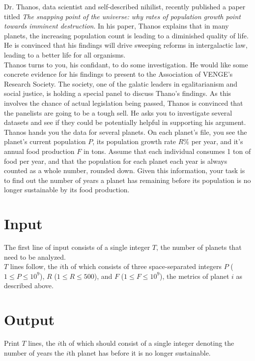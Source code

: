 
\noindent Dr. Thanos, data scientist and self-described nihilist, recently published a paper titled \textit{The snapping point of the universe: why rates of population growth point towards imminent destruction}. In his paper, Thanos explains that in many planets, the increasing population count is leading to a diminished quality of life. He is convinced that his findings will drive sweeping reforms in intergalactic law, leading to a better life for all organisms.\\

Thanos turns to you, his confidant, to do some investigation. He would like some concrete evidence for his findings to present to the Association of VENGE's Research Society. The society, one of the galatic leaders in egalitarianism and social justice, is holding a special panel to discuss Thano's findings. As this involves the chance of actual legislation being passed, Thanos is convinced that the panelists are going to be a tough sell. He asks you to investigate several datasets and see if they could be potentially helpful in supporting his argument.\\

Thanos hands you the data for several planets. On each planet's file, you see the planet's current population $P$, its population growth rate $R\%$ per year, and it's annual food production $F$ in tons. Assume that each individual consumes 1 ton of food per year, and that the population for each planet each year is always counted as a whole number, rounded down. Given this information, your task is to find out the number of years a planet has remaining before its population is no longer sustainable by its food production.

\section*{Input}
The first line of input consists of a single integer $T$, the number of planets that need to be analyzed.\\

\noindent $T$ lines follow, the $i$th of which consists of three space-separated integers $P$ ($1 \leq P \leq 10^9$), $R$ ($1 \le R \le 500$), and $F$ ($1 \leq F \leq 10^9$), the metrics of planet $i$ as described above.

\section*{Output}
Print $T$ lines, the $i$th of which should consist of a single integer denoting the number of years the $i$th planet has before it is no longer sustainable.\\
